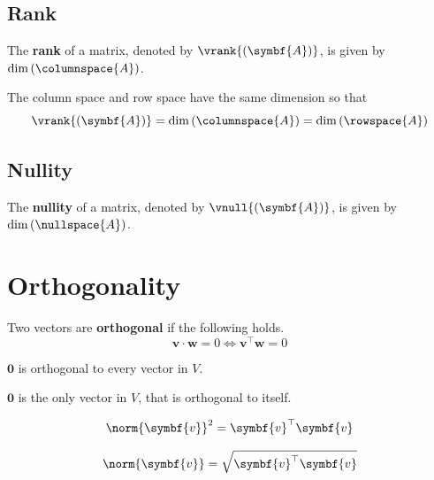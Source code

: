 \documentclass{article}
\begin{document}
\subsection{Rank}
\begin{definition}
    The \textbf{rank} of a matrix, denoted by
    \(\vrank{\left( \symbf{A} \right)}\), is given by
    \(\dim{\left( \columnspace{A} \right)}\).
\end{definition}
\begin{theorem}
    The column space and row space have the same dimension so that
    \begin{equation*}
        \vrank{\left( \symbf{A} \right)}=\dim{\left( \columnspace{A} \right)}=\dim{\left( \rowspace{A} \right)}
    \end{equation*}
\end{theorem}
\subsection{Nullity}
\begin{definition}
    The \textbf{nullity} of a matrix, denoted by
    \(\vnull{\left( \symbf{A} \right)}\), is given by
    \(\dim{\left( \nullspace{A} \right)}\).
\end{definition}
\section{Orthogonality}
\begin{definition}
    Two vectors are \textbf{orthogonal} if the following holds.
    \begin{equation*}
        \symbf{v}\cdot \symbf{w}=0 \iff \symbf{v}^{\top}\symbf{w}=0
    \end{equation*}
\end{definition}
\begin{theorem}
    \(\symbf{0}\) is orthogonal to every vector in \(V\).
\end{theorem}
\begin{theorem}
    \(\symbf{0}\) is the only vector in \(V\), that is orthogonal to
    itself.
\end{theorem}
\begin{theorem}
    \begin{equation*}
        \norm{\symbf{v}}^2=\symbf{v}^{\top}\symbf{v}
    \end{equation*}
\end{theorem}
\begin{theorem}
    \begin{equation*}
        \norm{\symbf{v}}=\sqrt{\symbf{v}^{\top}\symbf{v}}
    \end{equation*}
\end{theorem}
\end{document}
